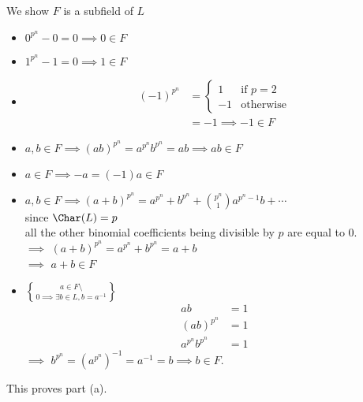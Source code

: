 We show $F$ is a subfield of $L$
\begin{itemize}
\item $0^{p^n}-0=0\implies0\in F$
\item $1^{p^n}-1=0\implies1\in F$
\item
\begin{align*}
(-1)^{p^n} &= \begin{cases}
1 & \text{if $p=2$} \\
-1 & \text{otherwise} \end{cases} \\
&= -1 \implies -1 \in F
\end{align*}
\item $a,b\in F \implies (ab)^{p^n} = a^{p^n}b^{p^n} = ab \implies ab\in F$
\item $a\in F \implies -a=(-1)a\in F$
\item $a,b\in F\implies (a+b)^{p^n} = a^{p^n} + b^{p^n} + \binom{p^n}{1}a^{p^n-1}b + \dotsb$ \\
since $\Char(L)=p$ \\
all the other binomial coefficients being divisible by $p$ are equal to $0$. \\
$\implies$ $(a+b)^{p^n}=a^{p^n}+b^{p^n}=a+b$ \\
$\implies$ $a+b\in F$ \\
\item $a\in F\setminus\brace0\implies\exists b\in L, b=a^{-1}$
\begin{align*}
ab &= 1 \\
(ab)^{p^n} &= 1 \\
a^{p^n}b^{p^n} &= 1
\end{align*}
$\implies$ $b^{p^n} = (a^{p^n})^{-1} = a^{-1} = b \implies b\in F$.
\end{itemize}
This proves part (a).
